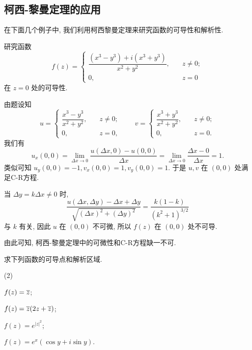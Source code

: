 \subsection{柯西-黎曼定理的应用}

在下面几个例子中, 我们利用柯西黎曼定理来研究函数的可导性和解析性.

\begin{example}
  研究函数
  \[
    f(z)=\begin{cases}
      \dfrac{(x^3-y^3)+i(x^3+y^3)}{x^2+y^2},\quad &z\neq 0;\\
      0,&z=0
    \end{cases}
  \]
  在 $z=0$ 处的可导性.
\end{example}
\begin{solution}
  由题设知
  \[
    u=\begin{cases}
      \dfrac{x^3-y^3}{x^2+y^2},\quad &z\neq 0;\\
      0,&z=0,
    \end{cases}\qquad
    v=\begin{cases}
      \dfrac{x^3+y^3}{x^2+y^2},\quad &z\neq 0;\\
      0,&z=0.
    \end{cases}
  \]
  我们有
  \[
    u_x(0,0)
    =\lim_{\Delta x\to 0}\frac{u(\Delta x,0)-u(0,0)}{\Delta x}
    =\lim_{\Delta x\to 0}\frac{\Delta x-0}{\Delta x}=1.
  \]
  类似可知 $u_y(0,0)=-1,v_x(0,0)=1,v_y(0,0)=1$.
  于是 $u,v$ 在 $(0,0)$ 处满足C-R方程.

  当 $\Delta y=k\Delta x\neq 0$ 时,
  \[
    \frac{u(\Delta x,\Delta y)-\Delta x+\Delta y}{\sqrt{(\Delta x)^2+(\Delta y)^2}}
    =\frac{k(1-k)}{(k^2+1)^{3/2}}
  \]
  与 $k$ 有关, 因此 $u$ 在 $(0,0)$ 不可微, 所以 $f(z)$ 在 $(0,0)$ 处不可导.
\end{solution}
由此可知, 柯西-黎曼定理中的可微性和C-R方程缺一不可.

\begin{example}
  求下列函数的可导点和解析区域.
  \begin{tasksexam}(2)
    \item {$f(z)=\overline z$;}
    \item {$f(z)=\overline z(2z+\overline z)$;}
    \item {$f(z)=e^{|z|^2}$;}
    \item {$f(z)=e^x(\cos y+i\sin y)$.}\label{enum:exp}
  \end{tasksexam}
\end{example}

